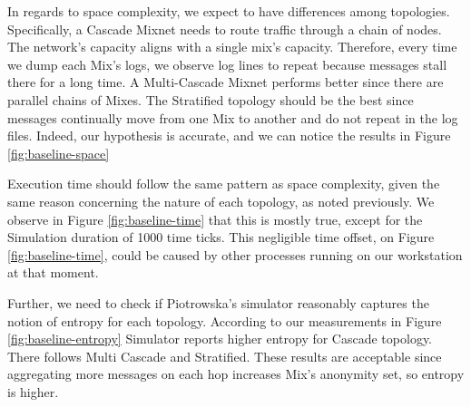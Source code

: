 \documentclass[logo,msc,cyber]{infthesis}   %
\begin{document}
In regards to space complexity, we expect to have differences among topologies.
Specifically, a Cascade Mixnet needs to route traffic through a chain of nodes.
The network's capacity aligns with a single mix's capacity. Therefore, every
time we dump each Mix's logs, we observe log lines to repeat because messages
stall there for a long time. A Multi-Cascade Mixnet performs better since there
are parallel chains of Mixes. The Stratified topology should be the best since
messages continually move from one Mix to another and do not repeat in the log
files. Indeed, our hypothesis is accurate, and we can notice the results in
Figure \ref{fig:baseline-space}

Execution time should follow the same pattern as space complexity, given the
same reason concerning the nature of each topology, as noted previously. We
observe in Figure \ref{fig:baseline-time} that this is mostly true, except for
the Simulation duration of 1000 time ticks. This negligible time offset, on
Figure \ref{fig:baseline-time}, could be caused by other processes running on
our workstation at that moment.

Further, we need to check if Piotrowska's simulator reasonably captures the
notion of entropy for each topology. According to our measurements in Figure
\ref{fig:baseline-entropy} Simulator reports higher entropy for Cascade
topology. There follows Multi Cascade and Stratified. These results are
acceptable since aggregating more messages on each hop increases Mix's anonymity
set, so entropy is higher.
\end{document}
